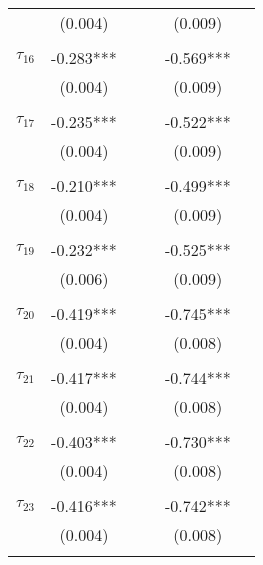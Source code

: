 \begin{tabular}{@{\extracolsep{-2pt}}lccccc}
            &  (0.004)  &&      &  (0.009)  &            \\
            &           &&      &           &            \\[-2.1ex]
$\tau_{16}$ & -0.283*** &&      & -0.569*** &            \\
            &  (0.004)  &&      &  (0.009)  &            \\
            &           &&      &           &            \\[-2.1ex]
$\tau_{17}$ & -0.235*** &&      & -0.522*** &            \\
            &  (0.004)  &&      &  (0.009)  &            \\
            &           &&      &           &            \\[-2.1ex]
$\tau_{18}$ & -0.210*** &&      & -0.499*** &            \\
            &  (0.004)  &&      &  (0.009)  &            \\
            &           &&      &           &            \\[-2.1ex]
$\tau_{19}$ & -0.232*** &&      & -0.525*** &            \\
            &  (0.006)  &&      &  (0.009)  &            \\
            &           &&      &           &            \\[-2.1ex]
$\tau_{20}$ & -0.419*** &&      & -0.745*** &            \\
            &  (0.004)  &&      &  (0.008)  &            \\
            &           &&      &           &            \\[-2.1ex]
$\tau_{21}$ & -0.417*** &&      & -0.744*** &            \\
            &  (0.004)  &&      &  (0.008)  &            \\
            &           &&      &           &            \\[-2.1ex]
$\tau_{22}$ & -0.403*** &&      & -0.730*** &            \\
            &  (0.004)  &&      &  (0.008)  &            \\
            &           &&      &           &            \\[-2.1ex]
$\tau_{23}$ & -0.416*** &&      & -0.742*** &            \\
            &  (0.004)  &&      &  (0.008)  &            \\
            &           &&      &           &            \\[-2.1ex]

\end{tabular}
